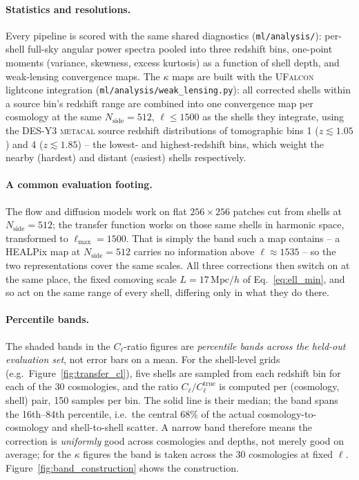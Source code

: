 \documentclass{report}
\begin{document}
\paragraph{Statistics and resolutions.} Every pipeline is scored with the same shared diagnostics (\texttt{ml/analysis/}): per-shell full-sky angular power spectra pooled into three redshift bins, one-point moments (variance, skewness, excess kurtosis) as a function of shell depth, and weak-lensing convergence maps. The $\kappa$ maps are built with the \textsc{UFalcon} lightcone integration \cite{sgier_fast_2018} (\texttt{ml/analysis/weak\_lensing.py}): all corrected shells within a source bin's redshift range are combined into one convergence map per cosmology at the same $N_{\mathrm{side}}=512$, $\ell \le 1500$ as the shells they integrate, using the DES-Y3 \textsc{metacal} source redshift distributions of tomographic bins 1 ($z \lesssim 1.05$) and 4 ($z \lesssim 1.85$) -- the lowest- and highest-redshift bins, which weight the nearby (hardest) and distant (easiest) shells respectively.

\paragraph{A common evaluation footing.} The flow and diffusion models work on flat \mbox{$256\times256$} patches cut from shells at \mbox{$N_{\mathrm{side}}=512$}; the transfer function works on those same shells in harmonic space, transformed to \mbox{$\ell_{\max}=1500$}. That is simply the band such a map contains -- a HEALPix map at \mbox{$N_{\mathrm{side}}=512$} carries no information above \mbox{$\ell \approx 1535$} -- so the two representations cover the same scales. All three corrections then switch on at the same place, the fixed comoving scale \mbox{$L = 17\,\mathrm{Mpc}/h$} of Eq.~\eqref{eq:ell_min}, and so act on the same range of every shell, differing only in what they do there.

\paragraph{Percentile bands.} The shaded bands in the $C_\ell$-ratio figures are \emph{percentile bands across the held-out evaluation set}, not error bars on a mean. For the shell-level grids (e.g.\ Figure~\ref{fig:transfer_cl}), five shells are sampled from each redshift bin for each of the 30 cosmologies, and the ratio \mbox{$C_\ell/C_\ell^{\mathrm{true}}$} is computed per (cosmology, shell) pair, 150 samples per bin. The solid line is their median; the band spans the 16th--84th percentile, i.e.\ the central 68\% of the actual cosmology-to-cosmology and shell-to-shell scatter. A narrow band therefore means the correction is \emph{uniformly} good across cosmologies and depths, not merely good on average; for the $\kappa$ figures the band is taken across the 30 cosmologies at fixed $\ell$. Figure~\ref{fig:band_construction} shows the construction.
\end{document}
